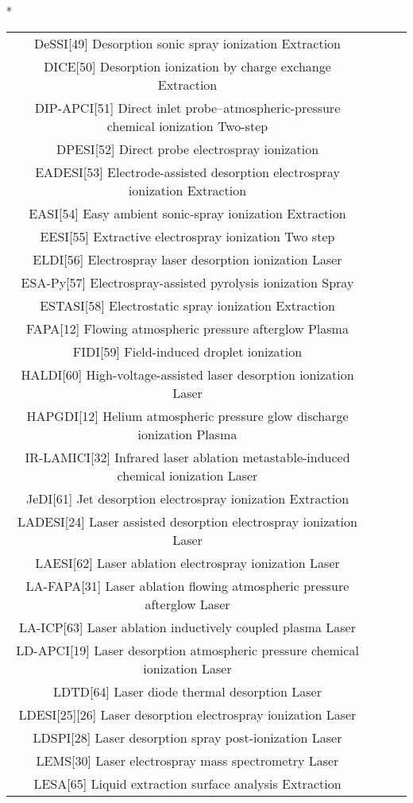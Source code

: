 \begin{table}{*}
\begin{tabular}{|c|c|c|l|}
DeSSI[49] Desorption sonic spray ionization Extraction \\
DICE[50] Desorption ionization by charge exchange Extraction \\
DIP-APCI[51] Direct inlet probe–atmospheric-pressure chemical ionization Two-step \\
DPESI[52] Direct probe electrospray ionization  \\
EADESI[53] Electrode-assisted desorption electrospray ionization Extraction \\
EASI[54] Easy ambient sonic-spray ionization Extraction \\
EESI[55] Extractive electrospray ionization Two step \\
ELDI[56] Electrospray laser desorption ionization Laser \\
ESA-Py[57] Electrospray-assisted pyrolysis ionization Spray \\
ESTASI[58] Electrostatic spray ionization Extraction \\
FAPA[12] Flowing atmospheric pressure afterglow Plasma \\
FIDI[59] Field-induced droplet ionization  \\
HALDI[60] High-voltage-assisted laser desorption ionization Laser \\
HAPGDI[12] Helium atmospheric pressure glow discharge ionization Plasma \\
IR-LAMICI[32] Infrared laser ablation metastable-induced chemical ionization Laser \\
JeDI[61] Jet desorption electrospray ionization Extraction \\
LADESI[24] Laser assisted desorption electrospray ionization Laser \\
LAESI[62] Laser ablation electrospray ionization Laser \\
LA-FAPA[31] Laser ablation flowing atmospheric pressure afterglow Laser \\
LA-ICP[63] Laser ablation inductively coupled plasma Laser \\
LD-APCI[19] Laser desorption atmospheric pressure chemical ionization Laser \\
LDTD[64] Laser diode thermal desorption Laser \\
LDESI[25][26] Laser desorption electrospray ionization Laser \\
LDSPI[28] Laser desorption spray post-ionization Laser \\ 
LEMS[30] Laser electrospray mass spectrometry Laser \\
LESA[65] Liquid extraction surface analysis Extraction \\

\end{tabular}
\end{table}
